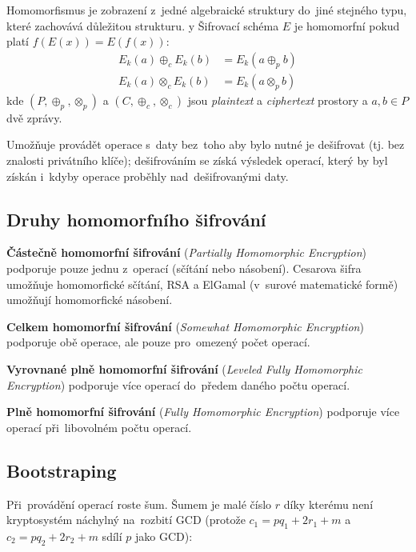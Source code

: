 Homomorfismus je zobrazení z~jedné algebraické struktury do~jiné stejného typu, které zachovává důležitou strukturu.
y
Šifrovací schéma $E$ je homomorfní pokud platí $f(E(x)) = E(f(x))$:
\begin{align*}
    E_k(a) \oplus_c E_k(b) &= E_k (a \oplus_p b)
    \\
    E_k(a) \otimes_c E_k(b) &= E_k(a \otimes_p b)
\end{align*}
\noindent
kde $(P, \oplus_p, \otimes_p)$ a $(C, \oplus_c, \otimes_c)$ jsou \emph{plaintext} a \emph{ciphertext} prostory a $a, b \in P$ dvě zprávy.

Umožňuje provádět operace s~daty bez~toho aby bylo nutné je dešifrovat (tj. bez znalosti privátního klíče); dešifrováním se získá výsledek operací, který by byl získán i~kdyby operace proběhly nad~dešifrovanými daty.

\subsection{Druhy homomorfního šifrování}


\textbf{Částečně homomorfní šifrování} (\emph{Partially Homomorphic Encryption}) podporuje pouze jednu z~operací (sčítání nebo násobení).
Cesarova šifra umožňuje homomorfické sčítání, RSA a ElGamal (v~surové matematické formě) umožňují homomorfické násobení.

\textbf{Celkem homomorfní šifrování} (\emph{Somewhat Homomorphic Encryption}) podporuje obě operace, ale pouze pro~omezený počet operací.

\textbf{Vyrovnané plně homomorfní šifrování} (\emph{Leveled Fully Homomorphic Encryption}) podporuje více operací do~předem daného počtu operací.

\textbf{Plně homomorfní šifrování} (\emph{Fully Homomorphic Encryption}) podporuje více operací při~libovolném počtu operací.

\subsection{Bootstraping}

Při~provádění operací roste šum. Šumem je malé číslo $r$ díky kterému není kryptosystém náchylný na~rozbití GCD (protože $c_1 = pq_1 + 2r_1 + m$ a $c_2 = pq_2 + 2r_2 + m$ sdílí $p$ jako GCD):

